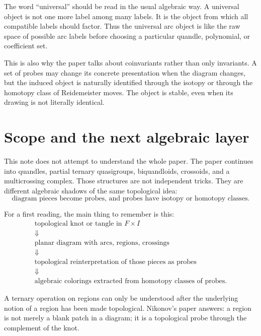 \begin{remark}
The word ``universal'' should be read in the usual algebraic way.  A universal object is not one more label among many labels.  It is the object from which all compatible labels should factor.  Thus the universal arc object is like the raw space of possible arc labels before choosing a particular quandle, polynomial, or coefficient set.
\end{remark}

This is also why the paper talks about coinvariants rather than only invariants.  A set of probes may change its concrete presentation when the diagram changes, but the induced object is naturally identified through the isotopy or through the homotopy class of Reidemeister moves.  The object is stable, even when its drawing is not literally identical.

\section{Scope and the next algebraic layer}

This note does not attempt to understand the whole paper.  The paper continues into quandles, partial ternary quasigroups, biquandloids, crossoids, and a multicrossing complex.  Those structures are not independent tricks.  They are different algebraic shadows of the same topological idea:
\[
  \text{diagram pieces become probes, and probes have isotopy or homotopy classes.}
\]

For a first reading, the main thing to remember is this:
\[
\begin{array}{c}
\text{topological knot or tangle in }F\times I\\
\Downarrow\\
\text{planar diagram with arcs, regions, crossings}\\
\Downarrow\\
\text{topological reinterpretation of those pieces as probes}\\
\Downarrow\\
\text{algebraic colorings extracted from homotopy classes of probes.}
\end{array}
\]

A ternary operation on regions can only be understood after the underlying notion of a region has been made topological.  Nikonov's paper answers: a region is not merely a blank patch in a diagram; it is a topological probe through the complement of the knot.
